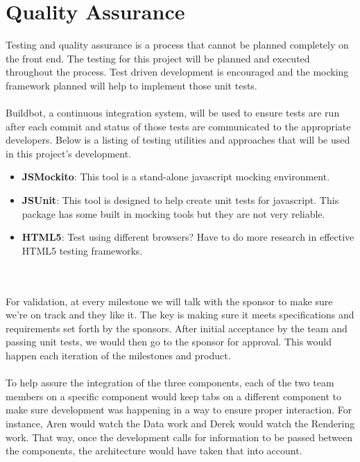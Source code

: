 \documentclass[12pt, letterpaper]{article}
\begin{document}
\section{Quality Assurance}
    Testing and quality assurance is a process that cannot be planned completely on the front end. The testing for this project will be planned and executed throughout the process. Test driven development is encouraged and the mocking framework planned will help to implement those unit tests.
	\\\\
	Buildbot, a continuous integration system, will be used to ensure tests are run after each commit and status of those tests are communicated to the appropriate developers. Below is a listing of testing utilities and approaches that will be used in this project's development.
\begin{itemize}
    \item {\bf JSMockito}: This tool is a stand-alone javascript mocking
    environment. 
    \item {\bf JSUnit}: This tool is designed to help create unit tests for
    javascript. This package has some built in mocking tools but they are not
    very reliable.
    \item {\bf HTML5}: Test using different browsers? Have to do more research
    in effective HTML5 testing frameworks.
\end{itemize}
	\\\\
	For validation, at every milestone we will talk with the sponsor to make sure we're on track and they like it. The key is making sure it meets specifications and requirements set forth by the sponsors. After initial acceptance by the team and passing unit tests, we would then go to the sponsor for approval. This would happen each iteration of the milestones and product.
	\\\\
	To help assure the integration of the three components, each of the two team members on a specific component would keep tabs on a different component to make sure development was happening in a way to ensure proper interaction. For instance, Aren would watch the Data work and Derek would watch the Rendering work. That way, once the development calls for information to be passed between the components, the architecture would have taken that into account.
\end{document}
